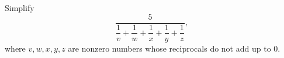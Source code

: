 Simplify
\[\dfrac{5}{\dfrac1v+\dfrac1w+\dfrac1x+\dfrac1y+\dfrac1z},\]
where $v,w,x,y,z$ are nonzero numbers whose reciprocals do not add up to $0$.
